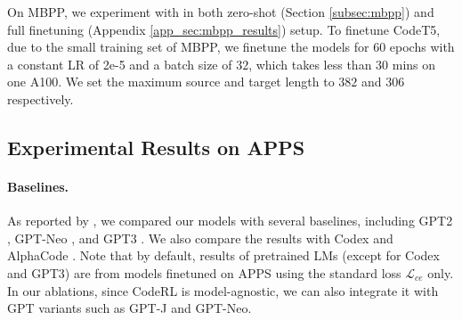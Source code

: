 \documentclass{article}
\begin{document}
On MBPP, we experiment with in both zero-shot (Section \ref{subsec:mbpp}) and full finetuning (Appendix \ref{app_sec:mbpp_results}) setup. 
To finetune CodeT5, due to the small training set of MBPP, we finetune the models for $60$ epochs with a constant LR of 2e-5 and a batch size of $32$, which takes less than $30$ mins on one A100. We set the maximum source and target  length to $382$ and $306$ respectively.

\subsection{Experimental Results on APPS}
\label{subsec:apps}
\paragraph{Baselines.} 
As reported by \citet{hendrycksapps2021}, we compared our models with several baselines, including GPT2 \citep{radford2019language}, GPT-Neo \citep{black10gpt}, and GPT3 \citep{brown2020language}.
We also compare the results with Codex \citep{chen2021evaluating} and AlphaCode \citep{li2022competition}.
Note that by default, results of pretrained LMs (except for Codex and GPT3) are from models finetuned on APPS using the standard loss $\mathcal{L}_{ce}$ only.
In our ablations, since CodeRL is model-agnostic, we can also integrate it with GPT variants such as GPT-J \citep{gpt-j} and GPT-Neo.
\end{document}
